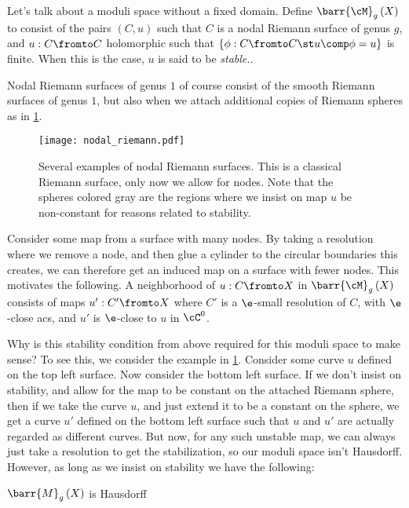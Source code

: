 \documentclass{amsart}
\begin{document}
Let's talk about a moduli space without a fixed domain.
Define $\barr{\cM}_g\left( X \right)$ to consist of the pairs
$\left( C , u \right)$ such that $C$ is a nodal Riemann surface of genus $g$, 
and $u:C\fromto C$ holomorphic such that 
$\left\{ \phi : C\fromto C \st u\comp \phi = u \right\}$ is finite.
When this is the case, $u$ is said to be \emph{stable.}.

\begin{exm}
Nodal Riemann surfaces of genus $1$ of course consist of the smooth
Riemann surfaces of genus $1$, but also when we attach additional
copies of Riemann spheres as in \cref{fig:nodal_riemann}.
\begin{figure}
\texttt{[image: nodal\_riemann.pdf]}
\caption{Several examples of nodal Riemann surfaces. 
This is a classical Riemann surface, only now we allow for nodes. 
Note that the spheres colored gray are the regions where we insist on map 
$u$ be non-constant for reasons related to stability.}
\label{fig:nodal_riemann}
\end{figure}
\end{exm}

Consider some map from a surface with many nodes. 
By taking a resolution where we remove a node, and then glue a cylinder to the 
circular boundaries this creates, we can therefore get an induced map on
a surface with fewer nodes.
This motivates the following.
A neighborhood of $u:C\fromto X$ in $\barr{\cM}_g\left( X \right)$
consists of maps 
$u':C'\fromto X$ where $C'$ is a $\e$-small resolution of $C$, with $\e$-close
acs, and $u'$ is $\e$-close to $u$ in $\cC^0$.

Why is this stability condition from above required for this moduli space to make sense?
To see this, we consider the example in \cref{fig:nodal_riemann}.
Consider some curve $u$ defined on the top left surface.
Now consider the bottom left surface.
If we don't insist on stability, and allow for the map to be constant
on the attached Riemann sphere, then if we take the curve $u$, 
and just extend it to be a constant on the sphere, we get a curve $u'$
defined on the bottom left surface such that $u$ and $u'$ are actually regarded as different
curves.
But now, for any such unstable map, we can always just take a resolution
to get the stabilization, so our moduli space isn't Hausdorff.
However, as long as we insist on stability we have the following:

\begin{lem}
$\barr{M}_g\left( X \right)$ is Hausdorff
\end{lem}
\end{document}
